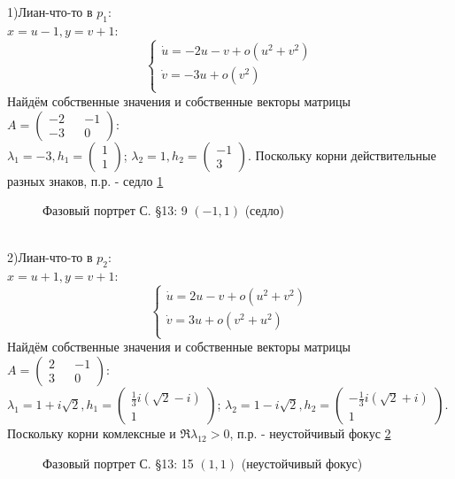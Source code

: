 \documentclass{article}
\begin{document}
1)Лиан-что-то в $p_1$:\\
$x=u-1,y=v+1$:
\begin{equation}
\begin{cases}
        \dot{u}=-2u-v+o(u^2+v^2)\\
        \dot{v}=-3u+o(v^2)\\
    \end{cases}    
\end{equation}
Найдём собственные значения и собственные векторы матрицы $A=\begin{pmatrix} -2 && -1 \\ -3 && 0 \end{pmatrix}$:\\
 $\lambda_1=-3,
 h_1 = \begin{pmatrix} 1 \\  1 \end{pmatrix} $; 
 $\lambda_2= 1,
 h_2 = \begin{pmatrix} -1  \\  3 \end{pmatrix} $. 
 Поскольку корни действительные разных знаков, п.р. - седло \ref{13.15.1}
 \begin{figure}[ht]
\caption{Фазовый портрет С. \S13: 9 $(-1,1)$ (седло)}
\label{13.15.1}
\end{figure}\\

2)Лиан-что-то в $p_2$:\\
$x=u+1,y=v+1$:
\begin{equation}
\begin{cases}
        \dot{u}=2u-v+o(u^2+v^2)\\
        \dot{v}=3u+o(v^2+u^2)\\
    \end{cases}    
\end{equation}
Найдём собственные значения и собственные векторы матрицы $A=\begin{pmatrix}2 && -1 \\ 3 && 0 \end{pmatrix}$:\\
 $\lambda_1=1+i \sqrt{2},
 h_1 = \begin{pmatrix} \frac{1}{3} i \left(\sqrt{2}-i\right) \\  1 \end{pmatrix} $; 
 $\lambda_2= 1-i \sqrt{2}   ,
 h_2 = \begin{pmatrix} -\frac{1}{3} i \left(\sqrt{2}+i\right) \\  1 \end{pmatrix} $. 
 Поскольку корни комлексные и $\Re \lambda_{12}>0$, п.р. - неустойчивый фокус \ref{13.15.2}
 \begin{figure}[ht]
\caption{Фазовый портрет С. \S13: 15 $(1,1)$ (неустойчивый фокус)}
\label{13.15.2}
\end{figure}\\
\end{document}
